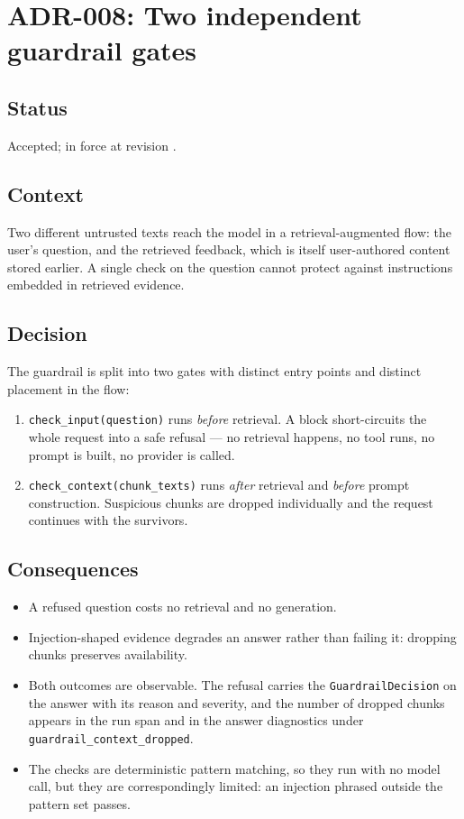 \section{ADR-008: Two independent guardrail gates}
\label{adr:008}

\subsection*{Status}

Accepted; in force at revision \texttt{\projectrevisionshort}.

\subsection*{Context}

Two different untrusted texts reach the model in a retrieval-augmented flow:
the user's question, and the retrieved feedback, which is itself user-authored
content stored earlier. A single check on the question cannot protect against
instructions embedded in retrieved evidence.

\subsection*{Decision}

The guardrail is split into two gates with distinct entry points and distinct
placement in the flow:

\begin{enumerate}[nosep]
  \item \texttt{check\_input(question)} runs \emph{before} retrieval. A block
    short-circuits the whole request into a safe refusal --- no retrieval
    happens, no tool runs, no prompt is built, no provider is called.
  \item \texttt{check\_context(chunk\_texts)} runs \emph{after} retrieval and
    \emph{before} prompt construction. Suspicious chunks are dropped
    individually and the request continues with the survivors.
\end{enumerate}

\subsection*{Consequences}

\begin{itemize}
  \item A refused question costs no retrieval and no generation.
  \item Injection-shaped evidence degrades an answer rather than failing it:
    dropping chunks preserves availability.
  \item Both outcomes are observable. The refusal carries the
    \texttt{GuardrailDecision} on the answer with its reason and severity, and
    the number of dropped chunks appears in the run span and in the answer
    diagnostics under \texttt{guardrail\_context\_dropped}.
  \item The checks are deterministic pattern matching, so they run with no
    model call, but they are correspondingly limited: an injection phrased
    outside the pattern set passes.
\end{itemize}

